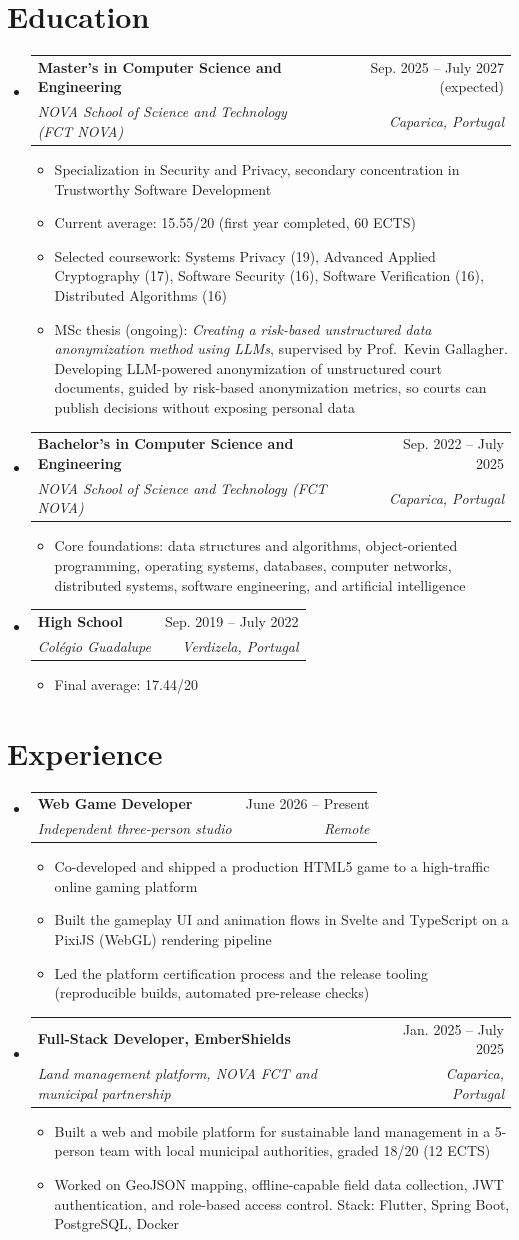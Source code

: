 \documentclass[a4paper,11pt]{article}
\makeatletter
\newcommand{\resumeItem}[1]{
  \item\small{
    {#1 \vspace{-2pt}}
  }
}
\newcommand{\resumeSubheading}[4]{
  \vspace{-2pt}\item
    \begin{tabular*}{0.97\textwidth}[t]{l@{\extracolsep{\fill}}r}
      \textbf{#1} & #2 \\
      \textit{\small#3} & \textit{\small #4} \\
    \end{tabular*}\vspace{-7pt}
}
\newcommand{\resumeSubHeadingListStart}{\begin{itemize}[leftmargin=0.15in, label={}]}
\newcommand{\resumeSubHeadingListEnd}{\end{itemize}}
\newcommand{\resumeItemListStart}{\begin{itemize}}
\newcommand{\resumeItemListEnd}{\end{itemize}\vspace{-5pt}}
\makeatother
\begin{document}
\section{Education}
  \resumeSubHeadingListStart
    \resumeSubheading
      {Master's in Computer Science and Engineering}{Sep. 2025 -- July 2027 (expected)}
      {NOVA School of Science and Technology (FCT NOVA)}{Caparica, Portugal}
      \resumeItemListStart
        \resumeItem{Specialization in Security and Privacy, secondary concentration in Trustworthy Software Development}
        \resumeItem{Current average: 15.55/20 (first year completed, 60 ECTS)}
        \resumeItem{Selected coursework: Systems Privacy (19), Advanced Applied Cryptography (17), Software Security (16), Software Verification (16), Distributed Algorithms (16)}
        \resumeItem{MSc thesis (ongoing): \emph{Creating a risk-based unstructured data anonymization method using LLMs}, supervised by Prof.\ Kevin Gallagher. Developing LLM-powered anonymization of unstructured court documents, guided by risk-based anonymization metrics, so courts can publish decisions without exposing personal data}
      \resumeItemListEnd
    \resumeSubheading
      {Bachelor's in Computer Science and Engineering}{Sep. 2022 -- July 2025}
      {NOVA School of Science and Technology (FCT NOVA)}{Caparica, Portugal}
      \resumeItemListStart
        \resumeItem{Core foundations: data structures and algorithms, object-oriented programming, operating systems, databases, computer networks, distributed systems, software engineering, and artificial intelligence}
      \resumeItemListEnd
    \resumeSubheading
      {High School}{Sep. 2019 -- July 2022}
      {Col\'egio Guadalupe}{Verdizela, Portugal}
      \resumeItemListStart
        \resumeItem{Final average: 17.44/20}
      \resumeItemListEnd
  \resumeSubHeadingListEnd

\section{Experience}
  \resumeSubHeadingListStart
    \resumeSubheading
      {Web Game Developer}{June 2026 -- Present}
      {Independent three-person studio}{Remote}
      \resumeItemListStart
        \resumeItem{Co-developed and shipped a production HTML5 game to a high-traffic online gaming platform}
        \resumeItem{Built the gameplay UI and animation flows in Svelte and TypeScript on a PixiJS (WebGL) rendering pipeline}
        \resumeItem{Led the platform certification process and the release tooling (reproducible builds, automated pre-release checks)}
      \resumeItemListEnd
    \resumeSubheading
      {Full-Stack Developer, EmberShields}{Jan. 2025 -- July 2025}
      {Land management platform, NOVA FCT and municipal partnership}{Caparica, Portugal}
      \resumeItemListStart
        \resumeItem{Built a web and mobile platform for sustainable land management in a 5-person team with local municipal authorities, graded 18/20 (12 ECTS)}
        \resumeItem{Worked on GeoJSON mapping, offline-capable field data collection, JWT authentication, and role-based access control. Stack: Flutter, Spring Boot, PostgreSQL, Docker}
      \resumeItemListEnd
  \resumeSubHeadingListEnd
\end{document}
